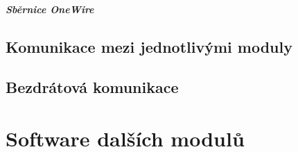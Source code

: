 \paragraph{Sběrnice OneWire}

\section{Komunikace mezi jednotlivými moduly}

\section{Bezdrátová komunikace}

\chapter{Software dalších modulů}
\label{chap:moduleSoftware}

\newpage